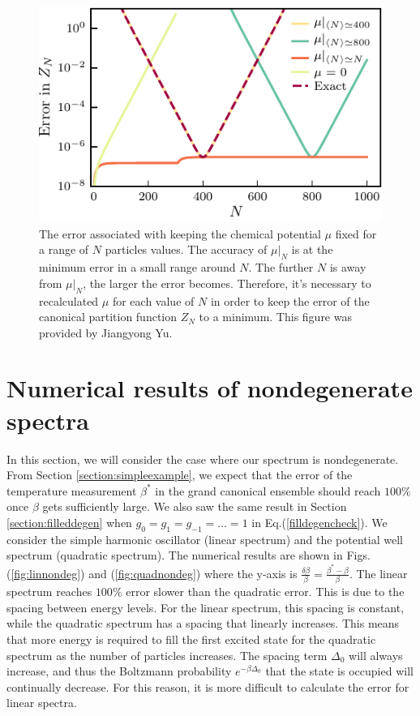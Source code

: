 \begin{figure}[H]
    \centering
    \includegraphics[scale=1.4]{figures/pdf/Plot1.pdf}
    \caption{The error associated with keeping the chemical potential $\mu$ fixed for a range of $N$ particles values. The accuracy of $\mu|_N$ is at the minimum error in a small range around $N$. The further $N$ is away from $\mu|_N$, the larger the error becomes. Therefore, it's necessary to recalculated $\mu$ for each value of $N$ in order to keep the error of the canonical partition function $Z_N$ to a minimum. This figure was provided by Jiangyong Yu. }
    \label{fig:Errors}
\end{figure}

\section{Numerical results of nondegenerate spectra}
In this section, we will consider the case where our spectrum is nondegenerate. From Section \ref{section:simpleexample}, we expect that the error of the temperature measurement $\beta^*$ in the grand canonical ensemble should reach $100\%$ once $\beta$ gets sufficiently large. We also saw the same result in Section \ref{section:filleddegen} when $g_0=g_1=g_{-1}=...=1$ in Eq.\@ (\ref{filldegencheck}). We consider the simple harmonic oscillator (linear spectrum) and the potential well spectrum (quadratic spectrum). The numerical results are shown in Figs.\@ (\ref{fig:linnondeg}) and (\ref{fig:quadnondeg}) where the y-axis is $\frac{\delta\beta}{\beta}=\frac{\beta^*-\beta}{\beta}$. %
The linear spectrum reaches $100\%$ error slower than the quadratic error. This is due to the spacing between energy levels. For the linear spectrum, this spacing is constant, while the quadratic spectrum has a spacing that linearly increases. This means that more energy is required to fill the first excited state for the quadratic spectrum as the number of particles increases. The spacing term $\Delta_0$ will always increase, and thus the Boltzmann probability $e^{-\beta\Delta_0}$ that the state is occupied will continually decrease. For this reason, it is more difficult to calculate the error for linear spectra. 

